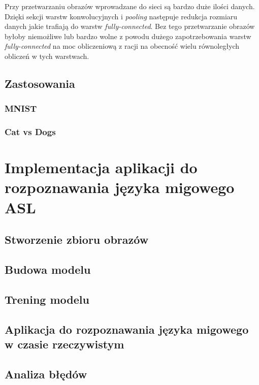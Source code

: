 \documentclass[a4paper,12pt,oneside]{book} %
\begin{document}
Przy przetwarzaniu obrazów wprowadzane do sieci są bardzo duże ilości danych. Dzięki sekcji warstw konwolucyjnych i \emph{pooling} następuje redukcja rozmiaru danych jakie trafiają do warstw \emph{fully-connected}. Bez tego przetwarzanie obrazów byłoby niemożliwe lub bardzo wolne z powodu dużego zapotrzebowania warstw \emph{fully-connected} na moc obliczeniową z racji na obecność wielu równoległych obliczeń w tych warstwach\cite{8308186}. 

\section{Zastosowania}
\lipsum[1]

\subsection{MNIST}
\lipsum[1]

\subsection{Cat vs Dogs}
\lipsum[1]

\chapter{Implementacja aplikacji do rozpoznawania języka migowego ASL}
\lipsum[1]

\section{Stworzenie zbioru obrazów}
\lipsum[1]

\section{Budowa modelu}
\lipsum[1]

\section{Trening modelu}
\lipsum[1]

\section{Aplikacja do rozpoznawania języka migowego w czasie rzeczywistym}
\lipsum[1]

\section{Analiza błędów}
\lipsum[1]
\end{document}
